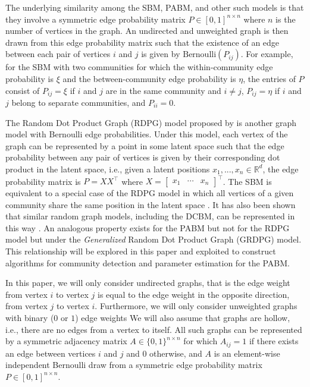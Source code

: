 \documentclass[
  12pt,
]{article}
\begin{document}
The underlying similarity among the SBM, PABM, and other such models is
that they involve a symmetric edge probability matrix
\(P \in [0, 1]^{n \times n}\) where \(n\) is the number of vertices in
the graph. An undirected and unweighted graph is then drawn from this
edge probability matrix such that the existence of an edge between each
pair of vertices \(i\) and \(j\) is given by
\(\text{Bernoulli}(P_{ij})\). For example, for the SBM with two
communities for which the within-community edge probability is \(\xi\)
and the between-community edge probability is \(\eta\), the entries of
\(P\) consist of \(P_{ij} = \xi\) if \(i\) and \(j\) are in the same
community and \(i \neq j\), \(P_{ij} = \eta\) if \(i\) and \(j\) belong
to separate communities, and \(P_{ii} = 0\).

The Random Dot Product Graph (RDPG) model proposed by
\citet*{10.1007/978-3-540-77004-6_11} is another graph model with
Bernoulli edge probabilities. Under this model, each vertex of the graph
can be represented by a point in some latent space such that the edge
probability between any pair of vertices is given by their corresponding
dot product in the latent space, i.e., given a latent positions
\(x_1, ..., x_n \in \mathbb{R}^d\), the edge probability matrix is
\(P = X X^\top\) where
\(X = \begin{bmatrix} x_1 & \cdots & x_n \end{bmatrix}^\top\). The SBM
is equivalent to a special case of the RDPG model in which all vertices
of a given community share the same position in the latent space
\cite{lyzinski2014}. It has also been shown that similar random graph
models, including the DCBM, can be represented in this way
\cite{lyzinski2014} \cite{rubindelanchy2017consistency}. An analogous
property exists for the PABM but not for the RDPG model but under the
\emph{Generalized} Random Dot Product Graph (GRDPG) model. This
relationship will be explored in this paper and exploited to construct
algorithms for community detection and parameter estimation for the
PABM.

In this paper, we will only consider undirected graphs, that is the edge
weight from vertex \(i\) to vertex \(j\) is equal to the edge weight in
the opposite direction, from vertex \(j\) to vertex \(i\). Furthermore,
we will only consider unweighted graphs with binary (\(0\) or \(1\))
edge weights We will also assume that graphs are hollow, i.e., there are
no edges from a vertex to itself. All such graphs can be represented by
a symmetric adjacency matrix \(A \in \{0, 1\}^{n \times n}\) for which
\(A_{ij} = 1\) if there exists an edge between vertices \(i\) and \(j\)
and \(0\) otherwise, and \(A\) is an element-wise independent Bernoulli
draw from a symmetric edge probability matrix
\(P \in [0, 1]^{n \times n}\).
\end{document}
